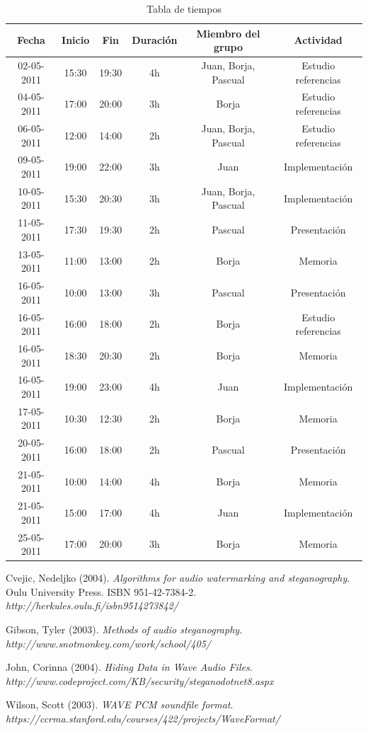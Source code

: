 \documentclass[12pt]{article}
\begin{document}
\begin{table}[h]

\centering
\begin{tabular}{|c|c|c|c|c|c|}
\hline Fecha & Inicio & Fin & Duración & Miembro del grupo & Actividad  \\ 
\hline 02-05-2011 & 15:30 & 19:30 & 4h & Juan, Borja, Pascual & Estudio referencias  \\
\hline 04-05-2011 & 17:00 & 20:00 & 3h & Borja & Estudio referencias  \\
\hline 06-05-2011 & 12:00 & 14:00 & 2h & Juan, Borja, Pascual & Estudio referencias  \\
\hline 09-05-2011 & 19:00 & 22:00 & 3h & Juan & Implementación  \\
\hline 10-05-2011 & 15:30 & 20:30 & 3h & Juan, Borja, Pascual & Implementación \\
\hline 11-05-2011 & 17:30 & 19:30 & 2h & Pascual & Presentación \\
\hline 13-05-2011 & 11:00 & 13:00 & 2h & Borja & Memoria \\
\hline 16-05-2011 & 10:00 & 13:00 & 3h & Pascual & Presentación \\
\hline 16-05-2011 & 16:00 & 18:00 & 2h & Borja & Estudio referencias \\
\hline 16-05-2011 & 18:30 & 20:30 & 2h & Borja & Memoria \\
\hline 16-05-2011 & 19:00 & 23:00 & 4h & Juan & Implementación \\
\hline 17-05-2011 & 10:30 & 12:30 & 2h & Borja & Memoria \\
\hline 20-05-2011 & 16:00 & 18:00 & 2h & Pascual & Presentación \\
\hline 21-05-2011 & 10:00 & 14:00 & 4h & Borja & Memoria \\
\hline 21-05-2011 & 15:00 & 17:00 & 4h & Juan & Implementación \\
\hline 25-05-2011 & 17:00 & 20:00 & 3h & Borja & Memoria \\
\hline 
\end{tabular}

\caption{Tabla de tiempos}
\end{table}

\newpage

\begin{thebibliography}{99}

Cvejic, Nedeljko (2004). \emph{Algorithms for audio watermarking and steganography}. Oulu University Press. ISBN 951-42-7384-2. \emph{http://herkules.oulu.fi/isbn9514273842/}


Gibson, Tyler (2003). \emph{Methods of audio steganography}. \emph{http://www.snotmonkey.com/work/school/405/}

John, Corinna (2004). \emph{Hiding Data in Wave Audio Files}. \emph{http://www.codeproject.com/KB/security/steganodotnet8.aspx}

Wilson, Scott (2003). \emph{WAVE PCM soundfile format}. \emph{https://ccrma.stanford.edu/courses/422/projects/WaveFormat/}

\end{thebibliography}
\end{document}
